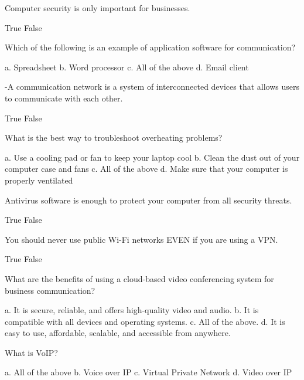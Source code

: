 \documentclass{exam}
\begin{document}
\begin{questions}
\question Computer security is only important for businesses.
\begin{checkboxes}
\choice True
\CorrectChoice False
\end{checkboxes}

\question Which of the following is an example of application software for communication?
\begin{checkboxes}
\choice a. Spreadsheet
\choice b. Word processor
\choice c. All of the above
\CorrectChoice d. Email client
\end{checkboxes}

-A communication network is a system of interconnected devices that allows users to communicate with each other.
\begin{checkboxes}
\CorrectChoice True
\choice False
\end{checkboxes}

\question What is the best way to troubleshoot overheating problems?
\begin{checkboxes}
\choice a. Use a cooling pad or fan to keep your laptop cool
\choice b. Clean the dust out of your computer case and fans
\CorrectChoice c. All of the above
\choice d. Make sure that your computer is properly ventilated
\end{checkboxes}

\question Antivirus software is enough to protect your computer from all security threats.
\begin{checkboxes}
\choice True
\CorrectChoice False
\end{checkboxes}

\question You should never use public Wi-Fi networks EVEN if you are using a VPN.
\begin{checkboxes}
\choice True
\CorrectChoice False
\end{checkboxes}

\question What are the benefits of using a cloud-based video conferencing system for business communication?
\begin{checkboxes}
\choice a. It is secure, reliable, and offers high-quality video and audio.
\choice b. It is compatible with all devices and operating systems.
\CorrectChoice c. All of the above.
\choice d. It is easy to use, affordable, scalable, and accessible from anywhere.
\end{checkboxes}

\question What is VoIP?
\begin{checkboxes}
\choice a. All of the above
\CorrectChoice b. Voice over IP
\choice c. Virtual Private Network
\choice d. Video over IP
\end{checkboxes}


\end{questions}
\end{document}
